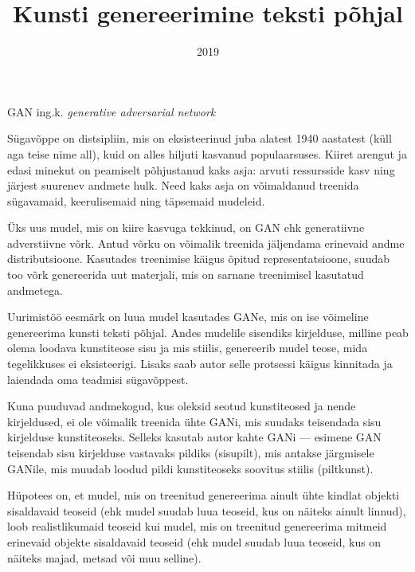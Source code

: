 \documentclass{vilgym}
\title{Kunsti genereerimine teksti põhjal}
\date{2019}
\begin{document}
	\maketitle
	\tableofcontents

	\begin{description}
		\let\originalitem\item
		\renewcommand*{\item}[1][]{\originalitem[#1]\label{def:#1}}

		\item{GAN} ing.k. \textit{generative adversarial network}
	\end{description}

	\newcommand*{\seedefinition}[1]{(\hyperref[def:#1]{vt~definitsiooni})}
	\newcommand*{\ingk}[1]{(\textit{ing. k. #1})}

	Sügavõppe on distsipliin, mis on eksisteerinud juba alatest 1940 aastatest (küll aga teise nime all), kuid on alles hiljuti kasvanud populaarsuses. Kiiret arengut ja edasi minekut on peamiselt põhjustanud kaks asja: arvuti ressursside kasv ning järjest suurenev andmete hulk. Need kaks asja on võimaldanud treenida sügavamaid, keerulisemaid ning täpsemaid mudeleid. \parencite{deeplearningbook}	 

	Üks uus mudel, mis on kiire kasvuga tekkinud, on GAN ehk generatiivne adverstiivne võrk. Antud võrku on võimalik treenida jäljendama erinevaid andme distributsioone. Kasutades treenimise käigus õpitud representatsioone, suudab too võrk genereerida uut materjali, mis on sarnane treenimisel kasutatud andmetega. \parencite{gan}

	Uurimistöö eesmärk on luua mudel kasutades GANe, mis on ise võimeline genereerima kunsti teksti põhjal. Andes mudelile sisendiks kirjelduse, milline peab olema loodava kunstiteose sisu ja mis stiilis, genereerib mudel teose, mida tegelikkuses ei eksisteerigi. Lisaks saab autor selle protsessi käigus kinnitada ja laiendada oma teadmisi sügavõppest.

	Kuna puuduvad andmekogud, kus oleksid seotud kunstiteosed ja nende kirjeldused, ei ole võimalik treenida ühte GANi, mis suudaks teisendada sisu kirjelduse kunstiteoseks. Selleks kasutab autor kahte GANi --- esimene GAN teisendab sisu kirjelduse vastavaks pildiks (sisu\textrightarrow pilt), mis antakse järgmisele GANile, mis muudab loodud pildi kunstiteoseks soovitus stiilis (pilt\textrightarrow kunst).

	Hüpotees on, et mudel, mis on treenitud genereerima ainult ühte kindlat objekti sisaldavaid teoseid (ehk mudel suudab luua teoseid, kus on näiteks ainult linnud), loob realistlikumaid teoseid kui mudel, mis on treenitud genereerima mitmeid erinevaid objekte sisaldavaid teoseid (ehk mudel suudab luua teoseid, kus on näiteks majad, metsad või muu selline).
\end{document}
